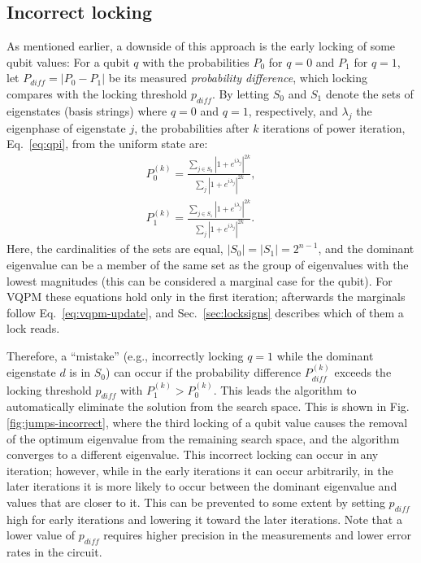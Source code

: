 \documentclass[onecolumn,10pt]{article}
\theoremstyle{remark}
\theoremstyle{plain}
\begin{document}
\subsection{Incorrect locking}
\label{sec:incorrectlocking}
As mentioned earlier, a downside of this approach is the early locking of some qubit values: For a qubit \(q\) with the probabilities \(P_0\) for \(q=0\) and \(P_1\) for \(q=1\), let \(P_{diff} = |P_0 - P_1|\) be its measured \emph{probability difference}, which locking compares with the locking threshold \(p_{diff}\). By letting \(S_0\) and \(S_1\) denote the sets of eigenstates (basis strings) where \(q = 0\) and \(q = 1\), respectively, and \(\lambda_j\) the eigenphase of eigenstate \(j\), the probabilities after \(k\) iterations of power iteration, Eq.~\eqref{eq:qpi}, from the uniform state are:
\begin{align}
P_0^{(k)} = \frac{\sum_{j \in S_0} |1 + e^{i\lambda_j}|^{2k}}{\sum_{j} |1 + e^{i\lambda_j}|^{2k}}, & \quad \label{eq:marginal0}\\
P_1^{(k)} = \frac{\sum_{j \in S_1} |1 + e^{i\lambda_j}|^{2k}}{\sum_{j} |1 + e^{i\lambda_j}|^{2k}}. \label{eq:marginal1}
\end{align}
Here, the cardinalities of the sets are equal, \( |S_0| = |S_1| = 2^{n-1} \), and the dominant eigenvalue can be a member of the same set as the group of eigenvalues with the lowest magnitudes (this can be considered a marginal case for the qubit). For VQPM these equations hold only in the first iteration; afterwards the marginals follow Eq.~\eqref{eq:vqpm-update}, and Sec.~\ref{sec:locksigns} describes which of them a lock reads.

Therefore, a ``mistake'' (e.g., incorrectly locking \(q = 1\) while the dominant eigenstate \(d\) is in \(S_0\)) can occur if the probability difference \(P_{diff}^{(k)}\) exceeds the locking threshold \(p_{diff}\) with \(P_1^{(k)}>P_0^{(k)}\). This leads the algorithm to automatically eliminate the solution from the search space. This is shown in Fig.\ref{fig:jumps-incorrect}, where the third locking of a qubit value causes the removal of the optimum eigenvalue from the remaining search space, and the algorithm converges to a different eigenvalue. This incorrect locking can occur in any iteration; however, while in the early iterations it can occur arbitrarily, in the later iterations it is more likely to occur between the dominant eigenvalue and values that are closer to it. This can be prevented to some extent by setting \(p_{diff}\) high for early iterations and lowering it toward the later iterations. Note that a lower value of \(p_{diff}\) requires higher precision in the measurements and lower error rates in the circuit.
\end{document}
